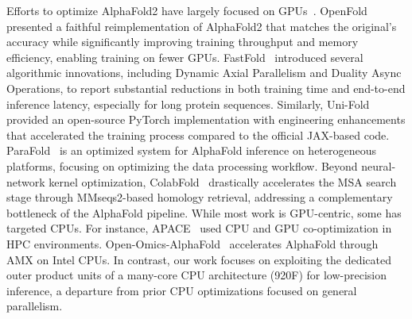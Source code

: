 Efforts to optimize AlphaFold2 have largely focused on GPUs~\cite{ahdritz2024openfold,zhu2024scalefold,cheng2024fastfold,zhong2022parafold,li2022uni,villegas2023manyfold}. OpenFold~\cite{ahdritz2024openfold} presented a faithful reimplementation of AlphaFold2 that matches the original's accuracy while significantly improving training throughput and memory efficiency, enabling training on fewer GPUs. FastFold~\cite{cheng2024fastfold} introduced several algorithmic innovations, including Dynamic Axial Parallelism and Duality Async Operations, to report substantial reductions in both training time and end-to-end inference latency, especially for long protein sequences. Similarly, Uni-Fold~\cite{li2022uni} provided an open-source PyTorch implementation with engineering enhancements that accelerated the training process compared to the official JAX-based code. ParaFold~\cite{zhong2022parafold} is an optimized system for AlphaFold inference on heterogeneous platforms, focusing on optimizing the data processing workflow. Beyond neural-network kernel optimization, ColabFold~\cite{mirdita2022colabfold} drastically accelerates the MSA search stage through MMseqs2-based homology retrieval, addressing a complementary bottleneck of the AlphaFold pipeline. While most work is GPU-centric, some has targeted CPUs. For instance, APACE~\cite{park2024apace} used CPU and GPU co-optimization in HPC environments. Open-Omics-AlphaFold~\cite{openomicsalphafold} accelerates AlphaFold through AMX on Intel CPUs. In contrast, our work focuses on exploiting the dedicated outer product units of a many-core CPU architecture (920F) for low-precision inference, a departure from prior CPU optimizations focused on general parallelism.

